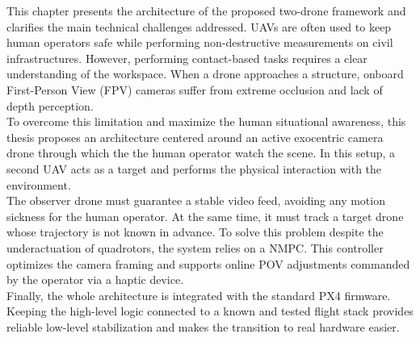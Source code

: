 This chapter presents the architecture of the proposed two-drone framework and clarifies the main technical challenges addressed. 
UAVs are often used to keep human operators safe while performing non-destructive measurements on civil infrastructures. However, performing contact-based tasks requires a clear understanding of the workspace. When a drone approaches a structure, onboard First-Person View (FPV) cameras suffer from extreme occlusion and lack of depth perception. 
\\To overcome this limitation and maximize the human situational awareness, this thesis proposes an architecture centered around an active exocentric camera drone through which the the human operator watch the scene. In this setup, a second UAV acts as a target and performs the physical interaction with the environment. 
\\The observer drone must guarantee a stable video feed, avoiding any motion sickness for the human operator. At the same time, it must track a target drone whose trajectory is not known in advance. To solve this problem despite the underactuation of quadrotors, the system relies on a NMPC. This controller optimizes the camera framing and supports online POV adjustments commanded by the operator via a haptic device. 
\\Finally, the whole architecture is integrated with the standard PX4 firmware. Keeping the high-level logic connected to a known and tested flight stack provides reliable low-level stabilization and makes the transition to real hardware easier.
